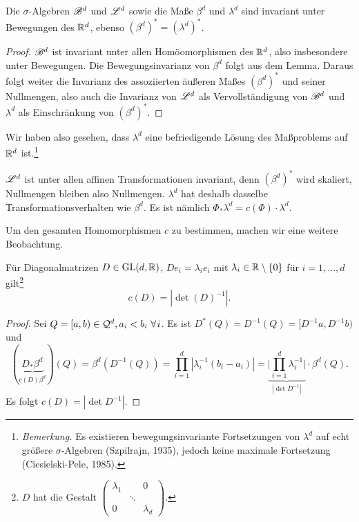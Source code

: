 \begin{satz}
\begin{mdframed}
Die $\sigma$-Algebren $\mathscr{B}^d$ und $\mathscr{L}^d$ sowie die Maße $\beta^d$ und $\lambda^d$ sind invariant unter Bewegungen des $\mathbb{R}^d$, ebenso $(\beta^d)^*=(\lambda^d)^*$.
\end{mdframed}
\begin{proof}
$\mathscr{B}^d$ ist invariant unter allen Homöomorphismen des $\mathbb{R}^d$, also insbesondere unter Bewegungen. Die Bewegungsinvarianz von $\beta^d$ folgt aus dem Lemma. Daraus folgt weiter die Invarianz des assoziierten äußeren Maßes $(\beta^d)^*$ und seiner Nullmengen, also auch die Invarianz von $\mathscr{L}^d$ als Vervollständigung von $\mathscr{B}^d$ und $\lambda^d$ als Einschränkung von $(\beta^d)^*$.
\end{proof}
\end{satz}

Wir haben also gesehen, dass $\lambda^d$ eine befriedigende Lösung des Maßproblems auf $\mathbb{R}^d$ ist.\footnote{\textit{Bemerkung.} Es existieren bewegungsinvariante Fortsetzungen von $\lambda^d$ auf echt größere $\sigma$-Algebren (Szpilrajn, 1935), jedoch keine maximale Fortsetzung (Ciesielski-Pele, 1985).}

\begin{remark}
$\mathscr{L}^d$ ist unter allen affinen Transformationen invariant, denn $(\beta^d)^*$ wird skaliert, Nullmengen bleiben also Nullmengen. $\lambda^d$ hat deshalb dasselbe Transformationsverhalten wie $\beta^d$. Es ist nämlich $\Phi_*\lambda^d=c(\Phi)\cdot \lambda^d$.
\end{remark}

Um den gesamten Homomorphismen $c$ zu bestimmen, machen wir eine weitere Beobachtung.

\begin{lemma}
Für Diagonalmatrizen $D \in \operatorname{GL}(d,\mathbb{R})$, $De_i=\lambda_i e_i$ mit $\lambda_i\in\mathbb{R}\setminus\{0\}$ für $i=1,...,d$ gilt\footnote{$D$ hat die Gestalt
$\begin{pmatrix}
	\lambda_1 & & 0 \\
	& \ddots&\\
	0&&\lambda_d
\end{pmatrix}$.
}
$$c(D)=|\det(D)^{-1}|.$$
\begin{proof}
Sei $Q = [a,b) \in \QQ^d, a_i<b_i\ \forall i$. Es ist $D^*(Q)=D^{-1}(Q)=[D^{-1}a,D^{-1}b)$ und 
$$
(\underbrace{D_*\beta^d}_{c(D)\beta^d})(Q)=\beta^d(D^{-1}(Q))=\prod_{i=1}^d |\lambda_i^{-1}(b_i-a_i)|=\underbrace{\bigg| \prod_{i=1}^d \lambda_i^{-1}\bigg|}_{|\det D^{-1}|} \cdot \beta^d(Q).
$$
Es folgt $c(D)=|\det D^{-1}|$.
\end{proof}
\end{lemma}

